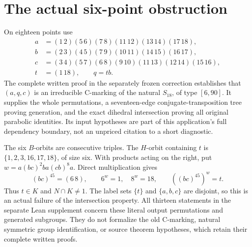 \documentclass[a4paper,11pt]{article}
\begin{document}
\section{The actual six-point obstruction}
On eighteen points use
\begin{align*}
 a&=(1\,2)(5\,6)(7\,8)(11\,12)(13\,14)(17\,18),\\
 b&=(2\,3)(4\,5)(7\,9)(10\,11)(14\,15)(16\,17),\\
 c&=(3\,4)(5\,7)(6\,8)(9\,10)(11\,13)(12\,14)(15\,16),\\
 t&=(1\,18),\qquad q=tb.
\end{align*}
The complete written proof in the separately frozen correction establishes
that $(a,q,c)$ is an irreducible C-marking of the natural $S_{18}$, of
type $[6,90]$. It supplies the whole permutations, a seventeen-edge
conjugate-transposition tree proving generation, and the exact dihedral
intersection proving all original parabolic identities. Its input
hypotheses are part of this application's full dependency boundary, not
an unpriced citation to a short diagnostic.

The six $B$-orbits are consecutive triples. The $H$-orbit containing
$t$ is $\{1,2,3,16,17,18\}$, of size six. With products acting on the
right, put $w=a(bc)^2ba(cb)^8a$. Direct multiplication gives
\[
 (bc)^{45}=(6\,8),\qquad 6^w=1,\quad8^w=18,
 \qquad ((bc)^{45})^w=t.
\]
Thus $t\in K$ and $N\cap K\ne1$. The label sets $\{t\}$ and
$\{a,b,c\}$ are disjoint, so this is an actual failure of the
intersection property. All thirteen statements in the separate Lean
supplement concern these literal output permutations and generated
subgroups. They do not formalize the old C-marking, natural symmetric
group identification, or source theorem hypotheses, which retain their
complete written proofs.
\end{document}
